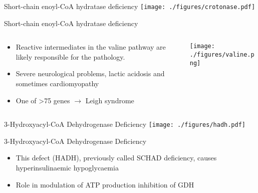 \documentclass[presentation, smaller]{beamer}
\begin{document}
\begin{frame}[label={sec:orgheadline29}]{Short-chain enoyl-CoA hydratase deficiency}
\texttt{[image: ./figures/crotonase.pdf]}
\end{frame}
\begin{frame}[label={sec:orgheadline30}]{Short-chain enoyl-CoA hydratase deficiency}
\begin{columns}
\begin{column}{0.5\columnwidth}
\begin{itemize}
\item Reactive intermediates in the valine pathway are likely responsible
for the pathology.
\item Severe neurological problems, lactic acidosis and sometimes
cardiomyopathy
\item One of >75 genes \(\to\) Leigh syndrome
\end{itemize}
\end{column}

\begin{column}{0.5\columnwidth}
\centering
\texttt{[image: ./figures/valine.png]}
\end{column}
\end{columns}
\end{frame}
\begin{frame}[label={sec:orgheadline31}]{3-Hydroxyacyl-CoA Dehydrogenase Deficiency}
\texttt{[image: ./figures/hadh.pdf]}
\end{frame}
\begin{frame}[label={sec:orgheadline32}]{3-Hydroxyacyl-CoA Dehydrogenase Deficiency}
\begin{itemize}
\item This defect (HADH), previously called SCHAD deficiency, causes
hyperinsulinaemic hypoglycaemia
\item Role in modulation of ATP production inhibition of GDH
\end{itemize}
\end{frame}
\end{document}
